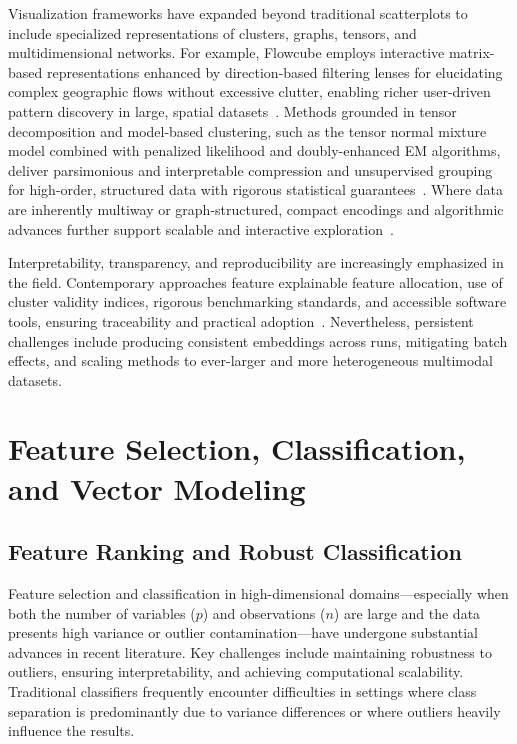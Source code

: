 \documentclass[sigconf]{acmart}
\begin{document}
Visualization frameworks have expanded beyond traditional scatterplots to include specialized representations of clusters, graphs, tensors, and multidimensional networks. For example, Flowcube employs interactive matrix-based representations enhanced by direction-based filtering lenses for elucidating complex geographic flows without excessive clutter, enabling richer user-driven pattern discovery in large, spatial datasets~\cite{ref53}. Methods grounded in tensor decomposition and model-based clustering, such as the tensor normal mixture model combined with penalized likelihood and doubly-enhanced EM algorithms, deliver parsimonious and interpretable compression and unsupervised grouping for high-order, structured data with rigorous statistical guarantees~\cite{ref58}. Where data are inherently multiway or graph-structured, compact encodings and algorithmic advances further support scalable and interactive exploration~\cite{ref79,ref86}.

Interpretability, transparency, and reproducibility are increasingly emphasized in the field. Contemporary approaches feature explainable feature allocation, use of cluster validity indices, rigorous benchmarking standards, and accessible software tools, ensuring traceability and practical adoption~\cite{ref53,ref79,ref90,ref92,ref96,ref99}. Nevertheless, persistent challenges include producing consistent embeddings across runs, mitigating batch effects, and scaling methods to ever-larger and more heterogeneous multimodal datasets.

\section{Feature Selection, Classification, and Vector Modeling}

\subsection{Feature Ranking and Robust Classification}

Feature selection and classification in high-dimensional domains—especially when both the number of variables ($p$) and observations ($n$) are large and the data presents high variance or outlier contamination—have undergone substantial advances in recent literature. Key challenges include maintaining robustness to outliers, ensuring interpretability, and achieving computational scalability. Traditional classifiers frequently encounter difficulties in settings where class separation is predominantly due to variance differences or where outliers heavily influence the results. 
\end{document}
